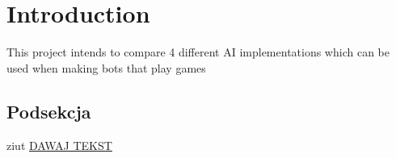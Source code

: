 \section{Introduction}
This project intends to compare 4 different AI implementations 
which can be used when making bots that play games

\subsection{Podsekcja}
ziut
\hyperref[sec:neat]{DAWAJ TEKST}
